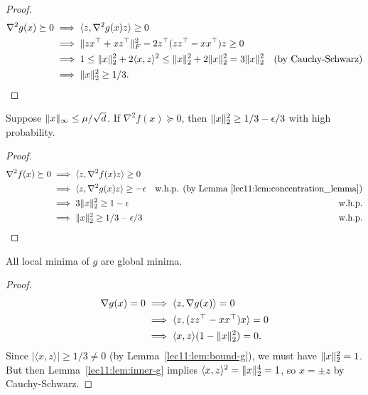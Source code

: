 \begin{proof}
\begin{align}
    \nabla^2 g(x) \succeq 0
    &\implies \langle z, \nabla^2 g(x)z\rangle \geq 0 \\
    &\implies \|zx^\top + xz^\top\|_F^2 - 2z^\top(zz^\top-xx^\top)z \geq 0 \\
    &\implies 1 \leq \|x\|_2^2 + 2\langle x,z \rangle^2 \leq \|x\|_2^2 + 2\|x\|_2^2 = 3\|x\|_2^2 &\text{(by Cauchy-Schwarz)} \\
    &\implies \|x\|_2^2 \geq 1/3.
\end{align}
\end{proof}

\begin{lemma}\label{lec11:lem:bound-f}
    Suppose $\|x\|_\infty \leq \mu / \sqrt{d}$. If $\nabla^2 f(x) \succeq 0$, then $\|x\|_2^2 \geq 1/3 - \epsilon/3$ with high probability.
\end{lemma}
\begin{proof}
\begin{align}
    \nabla^2 f(x) \succeq 0
    &\implies \langle z, \nabla^2 f(x)z \rangle \geq 0 \\
    &\implies \langle z, \nabla^2g(x)z \rangle \geq -\epsilon & \text{w.h.p. (by Lemma \ref{lec11:lem:concentration_lemma})} \\
    &\implies 3\|x\|_2^2 \geq 1-\epsilon & \text{w.h.p.} \\
    &\implies \|x\|_2^2 \geq 1/3 - \epsilon/3 & \text{w.h.p.}
\end{align}
\end{proof}

\begin{lemma}
    All local minima of $g$ are global minima.
\end{lemma}

\begin{proof}
\begin{align}
    \nabla g(x) = 0
    & \implies \langle z, \nabla g(x) \rangle = 0 \\
    & \implies \langle z, (zz^\top-xx^\top)x \rangle = 0 \\
    & \implies \langle x,z\rangle (1-\|x\|_2^2) = 0.
\end{align}
Since $|\langle x,z \rangle| \geq 1/3 \neq 0$ (by Lemma~\ref{lec11:lem:bound-g}), we must have $\|x\|_2^2 = 1$. But then Lemma~\ref{lec11:lem:inner-g} implies $\langle x, z\rangle^2 = \|x\|_2^4 = 1$, so $x = \pm z$ by Cauchy-Schwarz.
\end{proof}

